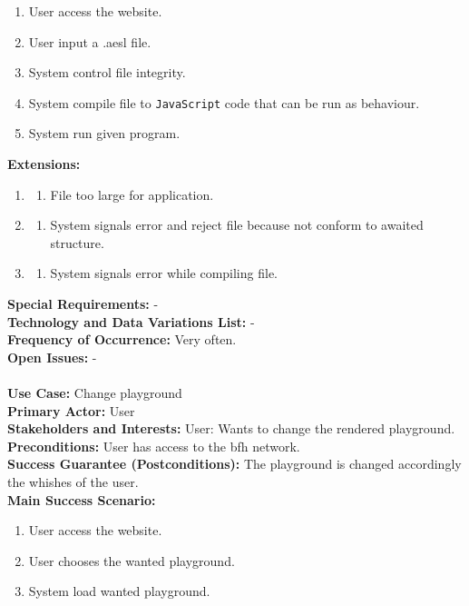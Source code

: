 \documentclass{scrbook}
\begin{document}
\begin{enumerate}
  \item User access the website.
  \item User input a .aesl file.
  \item System control file integrity.
  \item System compile file to \texttt{JavaScript} code that can be run as behaviour.
  \item System run given program.
\end{enumerate}
\textbf{Extensions: }
\begin{enumerate}\addtocounter{enumi}{1}
  \item 
  \begin{enumerate}
    \item File too large for application.
  \end{enumerate}
  \item
  \begin{enumerate}
    \item System signals error and reject file because not conform to awaited structure.
  \end{enumerate}
  \item 
  \begin{enumerate}
    \item System signals error while compiling file.
  \end{enumerate}
\end{enumerate}
\textbf{Special Requirements: }- \\
\textbf{Technology and Data Variations List: }- \\
\textbf{Frequency of Occurrence: }Very often. \\
\textbf{Open Issues: }- \\
\\
\textbf{Use Case: }Change playground \\
\textbf{Primary Actor: }User \\
\textbf{Stakeholders and Interests: }User: Wants to change the rendered playground. \\
\textbf{Preconditions: }User has access to the bfh network. \\
\textbf{Success Guarantee (Postconditions): }The playground is changed accordingly the whishes of the user. \\
\textbf{Main Success Scenario: }
\begin{enumerate}
  \item User access the website.
  \item User chooses the wanted playground.
  \item System load wanted playground.
\end{enumerate}
\end{document}
